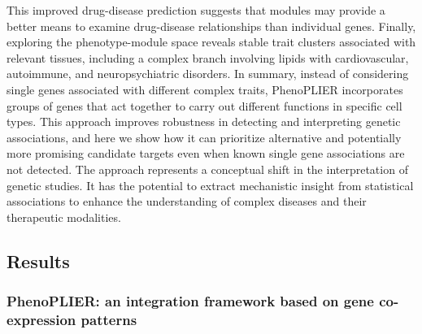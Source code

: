 \documentclass[
  a4paper,
]{article}
\begin{document}
This improved drug-disease prediction suggests that modules may provide a better means to examine drug-disease relationships than individual genes.
Finally, exploring the phenotype-module space reveals stable trait clusters associated with relevant tissues, including a complex branch involving lipids with cardiovascular, autoimmune, and neuropsychiatric disorders.
In summary, instead of considering single genes associated with different complex traits, PhenoPLIER incorporates groups of genes that act together to carry out different functions in specific cell types.
This approach improves robustness in detecting and interpreting genetic associations, and here we show how it can prioritize alternative and potentially more promising candidate targets even when known single gene associations are not detected.
The approach represents a conceptual shift in the interpretation of genetic studies.
It has the potential to extract mechanistic insight from statistical associations to enhance the understanding of complex diseases and their therapeutic modalities.

\hypertarget{results}{%
\subsection{Results}\label{results}}

\hypertarget{phenoplier-an-integration-framework-based-on-gene-co-expression-patterns}{%
\subsubsection{PhenoPLIER: an integration framework based on gene co-expression patterns}\label{phenoplier-an-integration-framework-based-on-gene-co-expression-patterns}}
\end{document}
